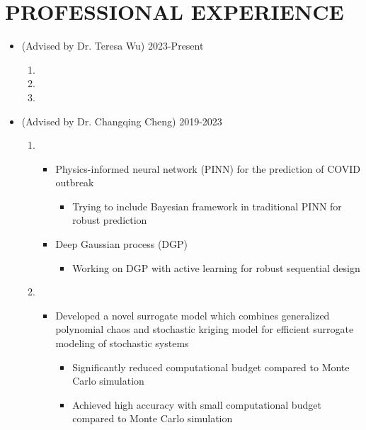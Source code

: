 \documentclass[10pt]{article}
\begin{document}
\section*{PROFESSIONAL EXPERIENCE}
\begin{itemize}
	\item {} (Advised by Dr. Teresa Wu)
        \hfill{2023-Present}
        \begin{enumerate}
            \item {}
            \item {}
            \item {}
        \end{enumerate}
        
        
	\item {} (Advised by Dr. Changqing Cheng)
	\hfill{2019-2023}
	\begin{enumerate}
	
	    \item {}
		\begin{itemize}[label=$\bullet$]
		    \item Physics-informed neural network (PINN) for the prediction of COVID outbreak 
		    \begin{itemize}[label=$-$]
	            \item Trying to include Bayesian framework in traditional PINN for robust prediction
	        \end{itemize}
	        
		    \item Deep Gaussian process (DGP)
		    \begin{itemize}[label=$-$]
	            \item Working on DGP with active learning for robust sequential design 
	        \end{itemize}
		\end{itemize}
		
	    \item {}
	    \begin{itemize}[label=$\bullet$]
	        \item Developed a novel surrogate model which combines generalized polynomial chaos and stochastic kriging model for efficient surrogate modeling of stochastic systems
	        \begin{itemize}[label=$-$]
	            \item Significantly reduced computational budget compared to Monte Carlo simulation
	            \item Achieved high accuracy with small computational budget compared to Monte Carlo simulation
	        \end{itemize}
	        

\end{itemize}
\end{enumerate}
\end{itemize}
\end{document}
